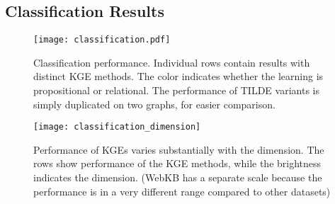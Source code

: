 \subsection{Classification Results}


\begin{figure}
	\centering
		\texttt{[image: classification.pdf]}
		\caption{Classification performance. Individual rows contain results with distinct KGE methods. The color indicates whether the learning is propositional or relational. The performance of TILDE variants is simply duplicated on two graphs, for easier comparison.}
		\label{fig:classification} 
\end{figure}
		

\begin{figure}
	\centering
		\texttt{[image: classification\_dimension]}
		\caption{Performance of KGEs varies substantially with the dimension. The rows show performance of the KGE methods, while the brightness indicates the dimension. (WebKB has a separate scale because the performance is in a very different range compared to other datasets)}
		\label{fig:clasVariance}
\end{figure}
		





